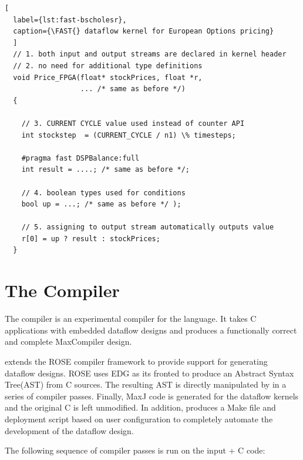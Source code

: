 \lstset{style=MaxC}

\begin{lstlisting}[
  label={lst:fast-bscholesr},
  caption={\FAST{} dataflow kernel for European Options pricing}
  ]
  // 1. both input and output streams are declared in kernel header
  // 2. no need for additional type definitions
  void Price_FPGA(float* stockPrices, float *r,
                  ... /* same as before */)
  {

    // 3. CURRENT CYCLE value used instead of counter API
    int stockstep  = (CURRENT_CYCLE / n1) \% timesteps;

    #pragma fast DSPBalance:full
    int result = ....; /* same as before */;

    // 4. boolean types used for conditions
    bool up = ...; /* same as before */ );

    // 5. assigning to output stream automatically outputs value
    r[0] = up ? result : stockPrices;
  }

\end{lstlisting}

\section{The \fastc{} Compiler}
\label{sec:implementation}

The \fastc{} compiler is an experimental compiler for the \FAST{}
language. It takes C applications with embedded \FAST{} dataflow
designs and produces a functionally correct and complete MaxCompiler
design.

\fastc{} extends the ROSE\cite{ROSE, Quinlan:2000} compiler framework
to provide support for generating dataflow designs. ROSE uses EDG as
its fronted to produce an Abstract Syntax Tree(AST) from C
sources. The resulting AST is directly manipulated by \fastc{} in a
series of compiler passes. Finally, MaxJ code is generated for the
dataflow kernels and the original C is left unmodified. In addition,
\fastc{} produces a Make file and deployment script based on user
configuration to completely automate the development of the dataflow
design.

The following sequence of compiler passes is run on the input \FAST{}
+ C code:

